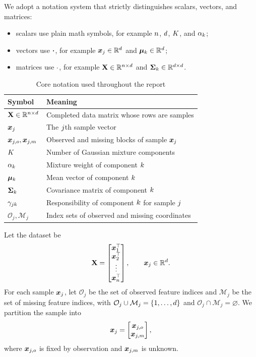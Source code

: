 We adopt a notation system that strictly distinguishes scalars, vectors, and matrices:
\begin{itemize}
    \item scalars use plain math symbols, for example $n$, $d$, $K$, and $\alpha_k$;
    \item vectors use $\bm{\cdot}$, for example $\bm{x}_j \in \mathbb{R}^{d}$ and $\bm{\mu}_k \in \mathbb{R}^{d}$;
    \item matrices use $\mathbf{\cdot}$, for example $\mathbf{X} \in \mathbb{R}^{n\times d}$ and $\mathbf{\Sigma}_k \in \mathbb{R}^{d\times d}$.
\end{itemize}

\begin{table}[t]
    \caption{Core notation used throughout the report}
    \label{tab:notation}
    \centering
    \begin{tabularx}{\linewidth}{@{}lX@{}}
        \toprule
        Symbol & Meaning \\
        \midrule
        $\mathbf{X} \in \mathbb{R}^{n\times d}$ & Completed data matrix whose rows are samples \\
        $\bm{x}_j$ & The $j$th sample vector \\
        $\bm{x}_{j,o}, \bm{x}_{j,m}$ & Observed and missing blocks of sample $\bm{x}_j$ \\
        $K$ & Number of Gaussian mixture components \\
        $\alpha_k$ & Mixture weight of component $k$ \\
        $\bm{\mu}_k$ & Mean vector of component $k$ \\
        $\mathbf{\Sigma}_k$ & Covariance matrix of component $k$ \\
        $\gamma_{jk}$ & Responsibility of component $k$ for sample $j$ \\
        $\mathcal{O}_j, \mathcal{M}_j$ & Index sets of observed and missing coordinates \\
        \bottomrule
    \end{tabularx}
\end{table}

Let the dataset be
\[
    \mathbf{X} =
    \begin{bmatrix}
        \bm{x}_1^\top\\
        \bm{x}_2^\top\\
        \vdots\\
        \bm{x}_{n}^\top
    \end{bmatrix},
    \qquad
    \bm{x}_j \in \mathbb{R}^{d}.
\]
For each sample $\bm{x}_j$, let $\mathcal{O}_j$ be the set of observed feature indices and $\mathcal{M}_j$ be the set of missing feature indices, with $\mathcal{O}_j \cup \mathcal{M}_j = \lbrace1,\dots,d\rbrace$ and $\mathcal{O}_j \cap \mathcal{M}_j = \varnothing$. We partition the sample into
\[
    \bm{x}_j =
    \begin{bmatrix}
        \bm{x}_{j,o}\\
        \bm{x}_{j,m}
    \end{bmatrix},
\]
where $\bm{x}_{j,o}$ is fixed by observation and $\bm{x}_{j,m}$ is unknown.

